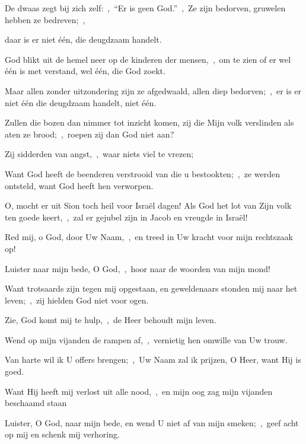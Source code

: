 \documentclass[12pt,twoside,a5paper]{article}
\begin{document}

\begin{halfparskip}
   De dwaas zegt bij zich zelf:~\sep\ ``Er is geen God.''~\sep\ Ze zijn bedorven, gruwelen hebben ze bedreven;~\sep


  daar is er niet één, die deugdzaam handelt.

  God blikt uit de hemel neer op de kinderen der mensen,~\sep\ om te zien of er wel één is met verstand, wel één, die God zoekt.

  Maar allen zonder uitzondering zijn ze afgedwaald, allen diep bedorven;~\sep\ er is er niet één die deugdzaam handelt, niet één.

  Zullen die bozen dan nimmer tot inzicht komen, zij die Mijn volk verslinden als aten ze brood;~\sep\ roepen zij dan God niet aan?

  Zij sidderden van angst,~\sep\ waar niets viel te vrezen;

  Want God heeft de beenderen verstrooid van die u bestookten;~\sep\ ze werden ontsteld, want God heeft hen verworpen.

  O, mocht er uit Sion toch heil voor Israël dagen! Als God het lot van Zijn volk ten goede keert,~\sep\ zal er gejubel zijn in Jacob en vreugde in Israël!

   Red mij, o God, door Uw Naam,~\sep\ en treed in Uw kracht voor mijn rechtszaak op!

  Luister naar mijn bede, O God,~\sep\ hoor naar de woorden van mijn mond!

  Want trotsaards zijn tegen mij opgestaan, en geweldenaars stonden mij naar het leven;~\sep\ zij hielden God niet voor ogen.

  Zie, God komt mij te hulp,~\sep\ de Heer behoudt mijn leven.

  Wend op mijn vijanden de rampen af,~\sep\ vernietig hen omwille van Uw trouw.

  Van harte wil ik U offers brengen;~\sep\ Uw Naam zal ik prijzen, O Heer, want Hij is goed.

  Want Hij heeft mij verlost uit alle nood,~\sep\ en mijn oog zag mijn vijanden beschaamd staan

   Luister, O God, naar mijn bede, en wend U niet af van mijn smeken;~\sep\ geef acht op mij en schenk mij verhoring.


\end{halfparskip}
\end{document}
